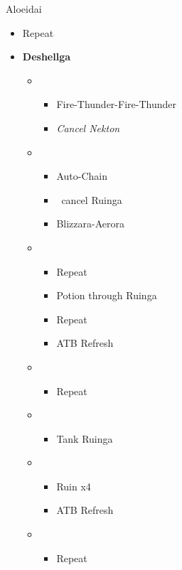 \begin{battle}{Aloeidai}
\begin{flushleft}
\begin{itemize}
\begin{itemize}
\begin{itemize}
					            \item Repeat
				            \end{itemize}
			      \end{itemize}
		\end{itemize}
		\begin{itemize}
			\item \textbf{Deshellga}
			      \begin{itemize}
				      \item \third
				            \begin{itemize}
					            \item Fire-Thunder-Fire-Thunder
					            \item \textit{Cancel Nekton}
				            \end{itemize}
				      \item \fifth
				            \begin{itemize}
					            \item Auto-Chain
					            \item \stagger\ cancel Ruinga
					            \item Blizzara-Aerora
				            \end{itemize}
				      \item \sixth
				            \begin{itemize}
					            \item Repeat
					            \item Potion through Ruinga
					            \item Repeat
					            \item ATB Refresh
				            \end{itemize}
				      \item \fifth
				            \begin{itemize}
					            \item Repeat
				            \end{itemize}
				      \item \fourth
				            \begin{itemize}
					            \item Tank Ruinga
				            \end{itemize}
				      \item \second
				            \begin{itemize}
					            \item Ruin x4
					            \item ATB Refresh
				            \end{itemize}
				      \item \first
				            \begin{itemize}
					            \item Repeat
				            \end{itemize}
			      \end{itemize}
		\end{itemize}
	\end{flushleft}
\end{battle}

